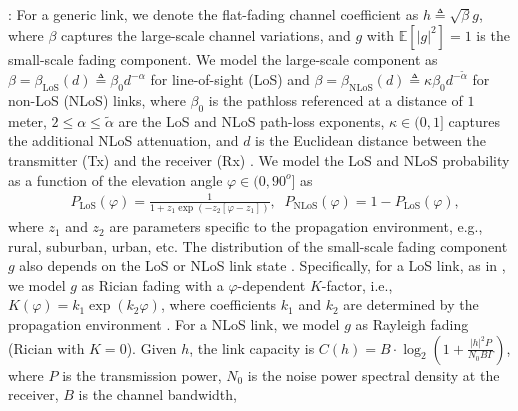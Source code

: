 \documentclass[12pt, draftcls, onecolumn]{IEEEtran}
\theoremstyle{plain}
\theoremstyle{definition}
\theoremstyle{remark}
\begin{document}
: For a generic link, we denote the flat-fading channel coefficient as $h{\triangleq}\sqrt{\beta}g$, where $\beta$ captures the large-scale channel variations, and $g$ with $\mathbb{E}\left[|g|^2\right]{=}1$ is the small-scale fading component. We model the large-scale component as $\beta{=}\beta_{\mathrm{LoS}}(d){\triangleq}\beta_{0}d^{-\alpha}$ for line-of-sight (LoS) and $\beta{=}\beta_{\mathrm{NLoS}}(d){\triangleq}\kappa\beta_{0}d^{-\tilde{\alpha}}$ for non-LoS (NLoS) links, where $\beta_{0}$ is the pathloss referenced at a distance of $1$ meter, $2{\leq}\alpha{\leq}\tilde{\alpha}$ are the LoS and NLoS path-loss exponents, $\kappa{\in}(0,1]$ captures the additional NLoS attenuation, and $d$ is the Euclidean distance between the transmitter (Tx) and the receiver (Rx) \cite{SCA}. We model the LoS and NLoS probability as a function of the elevation angle $\varphi{\in}(0,90^{o}]$ as \cite{LAP}
\begin{align}\label{eq:PLoS}
	&P_{\mathrm{LoS}}(\varphi)=\frac{1}{1+z_{1}\exp\left(-z_{2}\left[\varphi-z_{1}\right]\right)},\;\;
	P_{\mathrm{NLoS}}(\varphi)=1-P_{\mathrm{LoS}}(\varphi),
\end{align}
where $z_{1}$ and $z_{2}$ are parameters specific to the propagation environment, e.g., rural, suburban, urban, etc. The distribution of the small-scale fading component $g$ also depends on the LoS or NLoS link state \cite{WCBook}. Specifically, for a LoS link, as in \cite{Rician}, we model $g$ as Rician fading with a $\varphi$-dependent $K$-factor, i.e., $K(\varphi){=}k_{1}\exp\left(k_{2}\varphi\right)$, where coefficients $k_{1}$ and $k_{2}$ are determined by the propagation environment \cite{Rician}. For a NLoS link, we model $g$ as Rayleigh fading \cite{WCBook} (Rician with $K{=}0$). Given $h$, the link capacity is $C(h){=}B{\cdot}\log_{2}\left(1{+}\frac{|h|^{2}P}{N_{0}B\Gamma} \right)$, where $P$ is the transmission power, $N_{0}$ is the noise power spectral density at the receiver, $B$ is the channel bandwidth,
\end{document}
